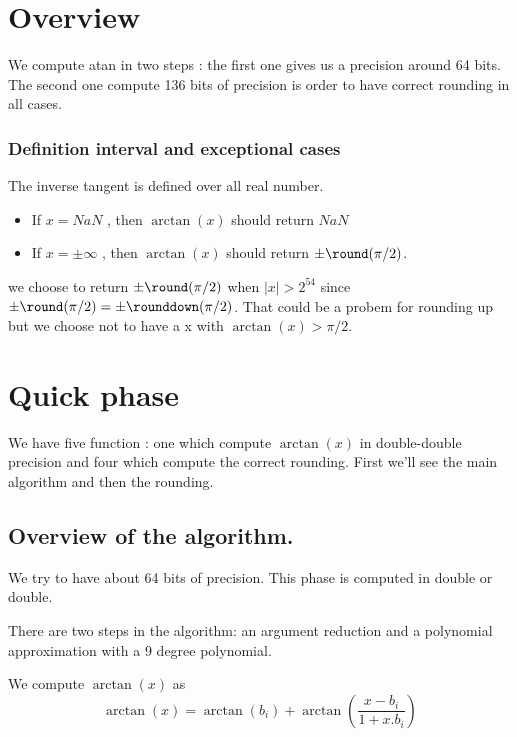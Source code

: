 \newcommand{\xred}{X_{\mathrm{red}}}
\newcommand{\xredhi}{X_{\mathrm{red hi}}}
\newcommand{\xredlo}{X_{\mathrm{red lo}}}

\section{Overview}

We compute atan in two steps : the first one gives us a precision around 64
bits. The second one compute 136 bits of precision is order to have
correct rounding in all cases.

\subsubsection{Definition interval and exceptional cases}

The inverse tangent is defined over all real number.

\begin{itemize}
\item If $x = NaN$ , then $\arctan(x)$ should return $NaN$
\item If $x = \pm\infty$ , then $\arctan(x)$ should return
$\pm\round(\pi/2)$. 
\end{itemize}
we choose to return $\pm\round(\pi/2)$ when $|x|>2^{54}$ since
$\pm\round(\pi/2) =\pm\rounddown(\pi/2) $. That could be a probem for
rounding up but we choose not to have a x with $\arctan(x) > \pi/2$.
\section{Quick phase}

We have five function : one which compute $\arctan(x)$ in double-double
precision and four which compute the correct rounding. First we'll see the
main algorithm and then the rounding.

\subsection{Overview of the algorithm.}

We try to have about 64 bits of precision. This phase is computed in double
or double.

There are two steps in the algorithm: an argument reduction and a polynomial
approximation with a 9 degree polynomial. 

We compute $\arctan(x)$ as 
\begin{equation}
\arctan(x) = \arctan( b_i ) + \arctan(\frac{x-b_i}{1+x.b_i}) \label{eq:arctan_redu}
\end{equation}

